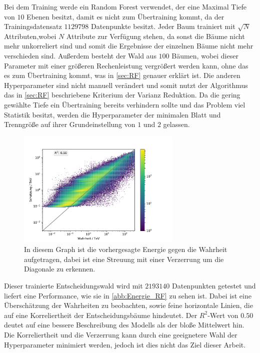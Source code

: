 Bei dem Training werde ein Random Forest verwendet, der eine Maximal Tiefe von $10$ Ebenen besitzt, damit es nicht zum Übertraining
kommt, da der Trainingsdatensatz $\num{1129798}$ Datenpunkte besitzt.
Jeder Baum trainiert mit $\sqrt{N}$ Attributen,wobei $N$ Attribute zur Verfügung stehen, da sonst die Bäume nicht mehr unkorreliert
sind und somit die Ergebnisse der einzelnen Bäume nicht mehr verschieden sind.
Außerdem besteht der Wald aus $100$ Bäumen, wobei dieser Parameter mit einer größeren Rechenleistung vergrößert werden kann, ohne
das es zum Übertraining kommt, was in \autoref{sec:RF} genauer erklärt ist.
Die anderen Hyperparameter sind nicht manuell verändert und somit nutzt der Algorithmus das in \autoref{sec:RF} beschriebene Kriterium der
Varianz Reduktion.
Da die gering gewählte Tiefe ein Übertraining bereits verhindern sollte und das Problem viel Statistik besitzt, werden die Hyperparameter
der minimalen Blatt und Trenngröße auf ihrer Grundeinstellung von $1$ und $2$ gelassen.
\begin{figure}
  \includegraphics[width=0.7\textwidth]{Plots/RF.pdf}
  \centering
  \caption{In diesem Graph ist die vorhergesagte Energie gegen die Wahrheit aufgetragen, dabei ist eine Streuung mit einer Verzerrung um die
          Diagonale zu erkennen.}
  \label{abb:Energie_RF}
\end{figure}
Dieser trainierte Entscheidungswald wird mit $\num{2193140}$ Datenpunkten getestet und liefert eine Performance, wie sie in \autoref{abb:Energie_RF} zu sehen ist.
Dabei ist eine Überschätzung der Wahrheiten zu beobachten, sowie feine horizontale Linien, die auf eine Korreliertheit der Entscheidungsbäume hindeutet.
Der $R^2$-Wert von $\num{0.50}$ deutet auf eine bessere Beschreibung des Modells als der bloße Mittelwert hin.
Die Korreliertheit und die Verzerrung kann durch eine geeignetere Wahl der Hyperparameter minimiert werden, jedoch ist dies nicht das Ziel dieser
Arbeit.

